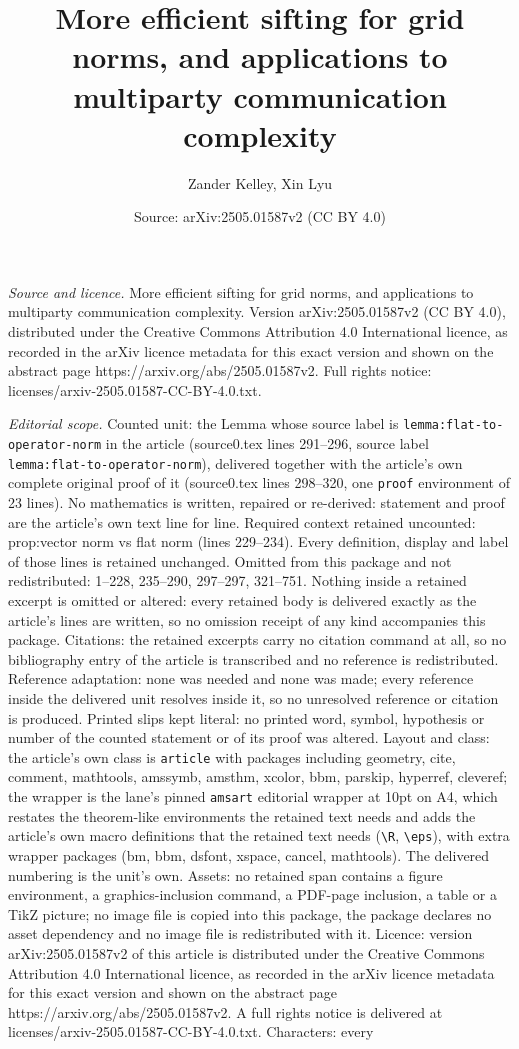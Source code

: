 \documentclass[10pt,a4paper]{amsart}
\title[More efficient sifting for grid norms, and applications to m]{More efficient sifting for grid norms, and applications to multiparty communication complexity}
\author{Zander Kelley, Xin Lyu}
\date{Source: arXiv:2505.01587v2 (CC BY 4.0)}
\begin{document}
\maketitle

\noindent\emph{Source and licence.} More efficient sifting for grid norms, and applications to multiparty communication complexity. Version arXiv:2505.01587v2 (CC BY 4.0), distributed under the Creative Commons Attribution 4.0 International licence, as recorded in the arXiv licence metadata for this exact version and shown on the abstract page https://arxiv.org/abs/2505.01587v2. Full rights notice: licenses/arxiv-2505.01587-CC-BY-4.0.txt.\par\smallskip

\noindent\textit{Editorial scope.} Counted unit: the Lemma whose source label is \texttt{lemma:flat-to-operator-norm} in the article (source0.tex lines 291--296, source label \texttt{lemma:flat-to-operator-norm}), delivered together with the article's own complete original proof of it (source0.tex lines 298--320, one \texttt{proof} environment of 23 lines). No mathematics is written, repaired or re-derived: statement and proof are the article's own text line for line. Required context retained uncounted: prop:vector norm vs flat norm (lines 229--234). Every definition, display and label of those lines is retained unchanged. Omitted from this package and not redistributed: 1--228, 235--290, 297--297, 321--751. Nothing inside a retained excerpt is omitted or altered: every retained body is delivered exactly as the article's lines are written, so no omission receipt of any kind accompanies this package. Citations: the retained excerpts carry no citation command at all, so no bibliography entry of the article is transcribed and no reference is redistributed. Reference adaptation: none was needed and none was made; every reference inside the delivered unit resolves inside it, so no unresolved reference or citation is produced. Printed slips kept literal: no printed word, symbol, hypothesis or number of the counted statement or of its proof was altered. Layout and class: the article's own class is \texttt{article} with packages including geometry, cite, comment, mathtools, amssymb, amsthm, xcolor, bbm, parskip, hyperref, cleveref; the wrapper is the lane's pinned \texttt{amsart} editorial wrapper at 10pt on A4, which restates the theorem-like environments the retained text needs and adds the article's own macro definitions that the retained text needs (\texttt{\textbackslash R}, \texttt{\textbackslash eps}), with extra wrapper packages (bm, bbm, dsfont, xspace, cancel, mathtools). The delivered numbering is the unit's own. Assets: no retained span contains a figure environment, a graphics-inclusion command, a PDF-page inclusion, a table or a TikZ picture; no image file is copied into this package, the package declares no asset dependency and no image file is redistributed with it. Licence: version arXiv:2505.01587v2 of this article is distributed under the Creative Commons Attribution 4.0 International licence, as recorded in the arXiv licence metadata for this exact version and shown on the abstract page https://arxiv.org/abs/2505.01587v2. A full rights notice is delivered at licenses/arxiv-2505.01587-CC-BY-4.0.txt. Characters: every 
\end{document}

